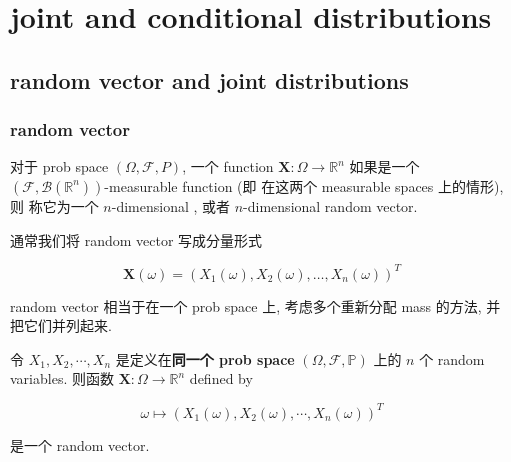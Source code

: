 \chapter{joint and conditional distributions}\label{joint-and-conditional-distributions}

\section{random vector and joint distributions}\label{random-vector-and-joint-distributions}

\subsection{random vector}\label{random-vector}

\begin{definition}{}

对于 prob space \((\Omega,\mathcal{F},\mathit{P})\), 一个 function \(\mathbf{X}:\Omega\rightarrow\mathbb{R}^{\mathit{n}}\) 如果是一个 \((\mathcal{F},\mathcal{B}(\mathbb{R}^{\mathit{n}}))\)-measurable function (即  在这两个 measurable spaces 上的情形), 则 称它为一个 \(\mathit{n}\)-dimensional , 或者 \(\mathit{n}\)-dimensional random vector.

通常我们将 random vector 写成分量形式

\[\mathbf{X}(\mathit{\omega}) = (\mathit{X}_{1}(\mathit{\omega}),\mathit{X}_{2}(\mathit{\omega}),\ldots,\mathit{X}_{\mathit{n}}(\mathit{\omega}))^{\mathit{T}}\]

\end{definition}

random vector 相当于在一个 prob space 上, 考虑多个重新分配 mass 的方法, 并把它们并列起来.

\begin{proposition}{}

令 \(\mathit{X}_{1},\mathit{X}_{2},\cdots,\mathit{X}_{\mathit{n}}\) 是定义在\textbf{同一个 prob space} \((\Omega,\mathcal{F},\mathbb{P})\) 上的 \(\mathit{n}\) 个 random variables. 则函数 \(\mathbf{X}:\Omega\rightarrow\mathbb{R}^{\mathit{n}}\) defined by

\[\mathit{\omega}\mapsto(\mathit{X}_{1}(\mathit{\omega}),\mathit{X}_{2}(\mathit{\omega}),\cdots,\mathit{X}_{\mathit{n}}(\mathit{\omega}))^{\mathit{T}}\]

是一个 random vector.

\end{proposition}

